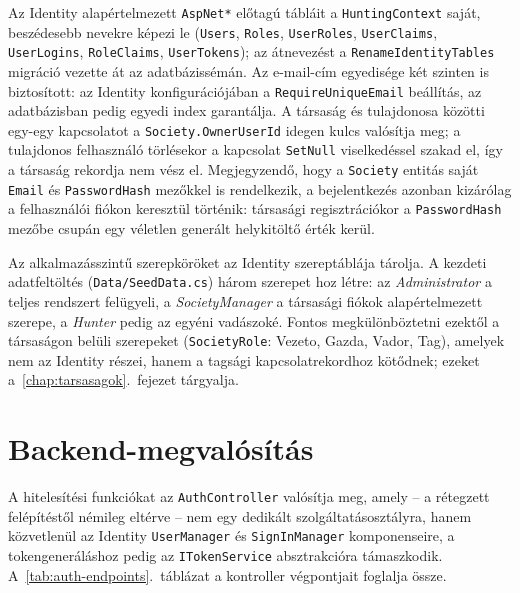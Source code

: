 Az Identity alapértelmezett \texttt{AspNet*} előtagú tábláit a \texttt{HuntingContext} saját,
beszédesebb nevekre képezi le (\texttt{Users}, \texttt{Roles}, \texttt{UserRoles},
\texttt{UserClaims}, \texttt{UserLogins}, \texttt{RoleClaims}, \texttt{UserTokens}); az átnevezést
a \texttt{RenameIdentityTables} migráció vezette át az adatbázissémán. Az e-mail-cím egyedisége
két szinten is biztosított: az Identity konfigurációjában a \texttt{RequireUniqueEmail} beállítás,
az adatbázisban pedig egyedi index garantálja. A társaság és tulajdonosa közötti egy-egy
kapcsolatot a \texttt{Society.OwnerUserId} idegen kulcs valósítja meg; a tulajdonos felhasználó
törlésekor a kapcsolat \texttt{SetNull} viselkedéssel szakad el, így a társaság rekordja nem vész
el. Megjegyzendő, hogy a \texttt{Society} entitás saját \texttt{Email} és \texttt{PasswordHash}
mezőkkel is rendelkezik, a bejelentkezés azonban kizárólag a felhasználói fiókon keresztül
történik: társasági regisztrációkor a \texttt{PasswordHash} mezőbe csupán egy véletlen generált
helykitöltő érték kerül.

Az alkalmazásszintű szerepköröket az Identity szereptáblája tárolja. A kezdeti adatfeltöltés
(\texttt{Data/SeedData.cs}) három szerepet hoz létre: az \emph{Administrator} a teljes rendszert
felügyeli, a \emph{SocietyManager} a társasági fiókok alapértelmezett szerepe, a \emph{Hunter}
pedig az egyéni vadászoké. Fontos megkülönböztetni ezektől a társaságon belüli szerepeket
(\texttt{SocietyRole}: Vezeto, Gazda, Vador, Tag), amelyek nem az Identity részei, hanem a tagsági
kapcsolatrekordhoz kötődnek; ezeket a~\ref{chap:tarsasagok}.~fejezet tárgyalja.

\section{Backend-megvalósítás}
\label{sec:users-backend}

A hitelesítési funkciókat az \texttt{AuthController} valósítja meg, amely -- a rétegzett
felépítéstől némileg eltérve -- nem egy dedikált szolgáltatásosztályra, hanem közvetlenül az
Identity \texttt{UserManager} és \texttt{SignInManager} komponenseire, a tokengeneráláshoz pedig
az \texttt{ITokenService} absztrakcióra támaszkodik. A~\ref{tab:auth-endpoints}.~táblázat a
kontroller végpontjait foglalja össze.

